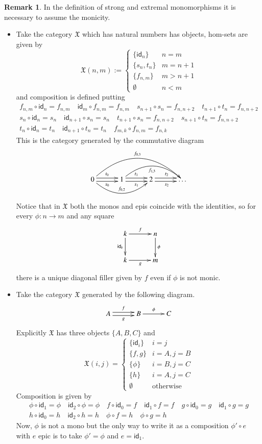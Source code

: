 \documentclass[12pt]{article}
\theoremstyle{definition}
\newtheorem{remark}[lemma]{Remark}
\def\X{\mathfrak X}
\numberwithin{equation}{section}
\newcommand{\id}[1]{\mathsf{id}_{#1}}
\begin{document}
\begin{remark}
In the definition of strong and extremal monomorphisms it is necessary to assume the monicity.

\begin{itemize} 
	\item Take the category $\X$ which has natural numbers has objects, hom-sets are  given by \[	\X(n,m):=\begin{cases}
	\{\id{n}\} & n=m\\
	\{s_n, t_n\} &m=n+1\\
	\{f_{n,m}\} &m>n+1\\
	\emptyset &n<m
	\end{cases}
	\] and composition is defined putting 
	\begin{gather*}	
	f_{n,m}\circ \id{n}=f_{n,m} \quad \id{m}\circ f_{n,m}=f_{n,m} \quad 
	s_{n+1}\circ s_n
	= f_{n, n+2}  \quad	t_{n+1}\circ t_n= f_{n, n+2} \\
	s_{n}\circ \id{n}=s_{n} \quad \id{n+1}\circ s_{n}=s_{n}  \quad  	t_{n+1}\circ s_n= f_{n, n+2}\quad s_{n+1}\circ t_n= f_{n, n+2}\\
	t_{n}\circ \id{n}=t_{n} \quad \id{n+1}\circ t_{n}=t_{n}  \quad 		 f_{m,k}\circ f_{n,m}=f_{n,k}
	\end{gather*}
	This is the category generated by the commutative diagram
	\[
	\xymatrix@C=30pt{
0\ar@/_1.6pc/[rr]^{f_{0,2}}\ar@<-.5ex>[r]_{s_0}\ar@<.5ex>[r]^{t_0}\ar@/^2.5pc/[rrr]^{f_{0,3}} & 1\ar@<-.5ex>[r]_{s_1}\ar@<.5ex>[r]^{t_1}\ar@/^1.6pc/[rr]_{f_{1,3}} & 2\ar@<-.5ex>[r]_{s_2}\ar@<.5ex>[r]^{t_2} &\dots  	
}
	\]
	
	Notice that in $\X$ both the monos and epis coincide with the identities, so for every $\phi:n\rightarrow m$ and any square 
	\[
	\xymatrix@C=30pt{
		k\ar[d]_-{\id{k}}\ar[r]^f&n\ar[d]^{\phi}\\
		k\ar[r]_g&m}
	\]
	there is a unique diagonal filler given by $f$ even if $\phi$ is not monic.
	\item Take the category $\X$ generated by the following diagram.
	\[
	\xymatrix@C=30pt{A\ar@<-.5ex>[r]_g  \ar@<.5ex>[r]^f&B\ar[r]^\phi &C	
}
	\]
	Explicitly $\X$ has three objects $\{A,B,C\}$ and
	\[
	\X(i,j)=\begin{cases}
	\{\id{i}\} &i=j\\
	\{f, g\} &i=A, j=B\\
	\{\phi\} & i=B, j=C\\
	\{h\} &i=A, j=C\\
	\emptyset & \text{otherwise}
	\end{cases} 
	\]
Composition is given by
\begin{gather*}
\phi \circ \id{1}=\phi \quad \id{2}\circ \phi = \phi\quad
f \circ \id{0}=f \quad \id{1}\circ f = f\quad
g \circ \id{0}=g \quad \id{1}\circ g = g \\
h\circ \id{0}=h \quad \id{2}\circ h= h \quad 
\phi \circ f=h \quad \phi \circ g= h 
\end{gather*}
Now, $\phi$ is not a mono but the only way to write it as a composition $\phi'\circ e$ with $e$ epic is to take $\phi'=\phi$ and $e=\id{1}$.
\end{itemize}


\end{remark}
\end{document}
